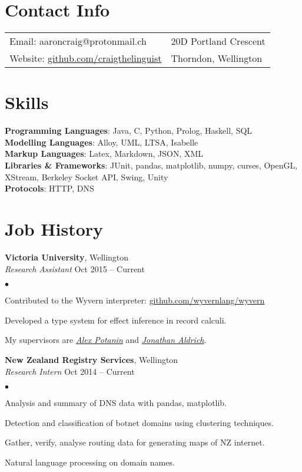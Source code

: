 \documentclass[margin,line]{res}
\newenvironment{list2}{
  \begin{list}{$\bullet$}{%
      \setlength{\itemsep}{0in}
      \setlength{\parsep}{0in} \setlength{\parskip}{0in}
      \setlength{\topsep}{0in} \setlength{\partopsep}{0in}
      \setlength{\leftmargin}{0.2in}}}
  {\end{list}}
\begin{document}
\begin{resume}

  \section{\sc Contact Info}
    \vspace{.05in}
    \begin{tabular}{@{}p{3.5in}p{3in}}
      {Email}: aaroncraig@protonmail.ch & 20D Portland Crescent \\
      {Website}:  \url{github.com/craigthelinguist}& Thorndon, Wellington \\
    \end{tabular}

   \section{\sc Skills}
    {\bf Programming Languages}: Java, C, Python, Prolog, Haskell, SQL\\
    {\bf Modelling Languages}: Alloy, UML, LTSA, Isabelle\\
    {\bf Markup Languages}: Latex, Markdown, JSON, XML\\
    {\bf Libraries \& Frameworks}: JUnit, pandas, matplotlib, numpy, curses, OpenGL, XStream, Berkeley Socket API, Swing, Unity\\
    {\bf Protocols}: HTTP, DNS

  \section{\sc Job History}
  
  	{\bf Victoria University}, Wellington\\
  	{\em Research Assistant} \hfill {Oct 2015 -- Current}
  	\begin{list2}
  		\item Contributed to the Wyvern interpreter: \url{github.com/wyvernlang/wyvern}
		\item Developed a type system for effect inference in record calculi.
  		\item My supervisors are \href{http://homepages.mcs.vuw.ac.nz/~alex/}{\textit{Alex Potanin}} and \href{http://www.cs.cmu.edu/~./aldrich/index.html}{\textit{Jonathan Aldrich}}.
	\end{list2}
  
    {\bf New Zealand Registry Services}, Wellington\\
    {\em Research Intern} \hfill {Oct 2014 -- Current}
    \begin{list2}
	\item Analysis and summary of DNS data with pandas, matplotlib.
	\item Detection and classification of botnet domains using clustering techniques.
	\item Gather, verify, analyse routing data for generating maps of NZ internet.
	\item Natural language processing on domain names.
    \end{list2}


\end{resume}
\end{document}
